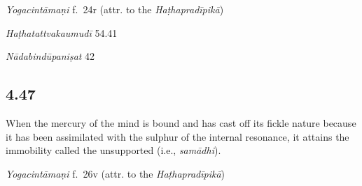 \begin{ekdosis}
\begin{testimonia}[hp04_046]
\emph{Yogacintāmaṇi} f.~24r (attr. to the \emph{Haṭhapradīpikā})
\begin{versinnote}
\end{versinnote}

\emph{Haṭhatattvakaumudī} 54.41
\begin{versinnote}
\end{versinnote}

\emph{Nādabindūpaniṣat} 42
\begin{versinnote}
\end{versinnote}
\end{testimonia}


\subsection*{4.47}
\begin{translation}[hp04_047]
When the mercury of the mind is bound and has cast off its fickle nature because it has been assimilated with the sulphur of the internal resonance, it attains the immobility called the unsupported (i.e., \textit{samādhi}).
\end{translation}


\begin{testimonia}[hp04_047]
\emph{Yogacintāmaṇi} f.~26v (attr. to the \emph{Haṭhapradīpikā})
\begin{versinnote}
\end{versinnote}


\end{testimonia}
\end{ekdosis}
